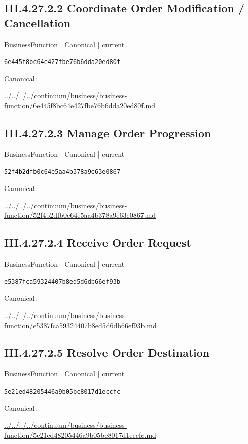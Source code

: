\documentclass[10pt,a4paper]{article}
\begin{document}
\subsection*{III.4.27.2.2 Coordinate Order Modification / Cancellation}
{\small BusinessFunction | Canonical | current}\par
\texttt{6e445f8bc64e427fbe76b6dda20ed80f}\par
Canonical: \par
{\footnotesize\url{../../../../continuum/business/business-function/6e445f8bc64e427fbe76b6dda20ed80f.md}}\par
\subsection*{III.4.27.2.3 Manage Order Progression}
{\small BusinessFunction | Canonical | current}\par
\texttt{52f4b2dfb0c64e5aa4b378a9e63e0867}\par
Canonical: \par
{\footnotesize\url{../../../../continuum/business/business-function/52f4b2dfb0c64e5aa4b378a9e63e0867.md}}\par
\subsection*{III.4.27.2.4 Receive Order Request}
{\small BusinessFunction | Canonical | current}\par
\texttt{e5387fca59324407b8ed5d6db66ef93b}\par
Canonical: \par
{\footnotesize\url{../../../../continuum/business/business-function/e5387fca59324407b8ed5d6db66ef93b.md}}\par
\subsection*{III.4.27.2.5 Resolve Order Destination}
{\small BusinessFunction | Canonical | current}\par
\texttt{5e21ed48205446a9b05bc8017d1eccfc}\par
Canonical: \par
{\footnotesize\url{../../../../continuum/business/business-function/5e21ed48205446a9b05bc8017d1eccfc.md}}\par
\end{document}

